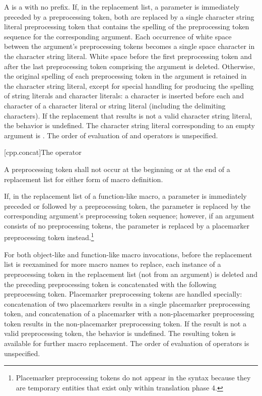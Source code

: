 \pnum
A  is a  with no prefix.
If, in the replacement list, a parameter is immediately
preceded by a
\tcode{\#}
preprocessing token,
both are replaced by a single character string literal preprocessing token that
contains the spelling of the preprocessing token sequence for the
corresponding argument.
Each occurrence of white space between the argument's preprocessing
tokens becomes a single space character in the character string literal.
White space before the first preprocessing token and after the last
preprocessing token comprising the argument is deleted.
Otherwise, the original spelling of each preprocessing token in the
argument is retained in the character string literal,
except for special handling for producing the spelling of
string literals and character literals:
a
\tcode{\textbackslash}
character is inserted before each
and
\tcode{\textbackslash}
character of a character literal or string literal
(including the delimiting
characters).
If the replacement that results is not a valid character string literal,
the behavior is undefined. The character string literal corresponding to
an empty argument is .
The order of evaluation of
\tcode{\#}
and
\tcode{\#\#}
operators is unspecified.

[cpp.concat]{The \tcode{\#\#} operator}%
%

\pnum
A
\tcode{\#\#}
preprocessing token shall not occur at the beginning or
at the end of a replacement list for either form
of macro definition.

\pnum
If, in the replacement list of a function-like macro, a parameter is
immediately preceded or followed by a
\tcode{\#\#}
preprocessing token, the parameter is replaced by the
corresponding argument's preprocessing token sequence; however, if an argument consists of no preprocessing tokens, the parameter is
replaced by a placemarker preprocessing token instead.\footnote{Placemarker preprocessing tokens do not appear in the syntax
because they are temporary entities that exist only within translation phase 4.}

\pnum
For both object-like and function-like macro invocations, before the
replacement list is reexamined for more macro names to replace,
each instance of a
\tcode{\#\#}
preprocessing token in the replacement list
(not from an argument) is deleted and the
preceding preprocessing token is concatenated
with the following preprocessing token.
Placemarker preprocessing tokens are handled specially: concatenation
of two placemarkers results in a single placemarker preprocessing token, and
concatenation of a placemarker with a non-placemarker preprocessing token results
in the non-placemarker preprocessing token.
If the result is not a valid preprocessing token,
the behavior is undefined.
The resulting token is available for further macro replacement.
The order of evaluation of
\tcode{\#\#}
operators is unspecified.

